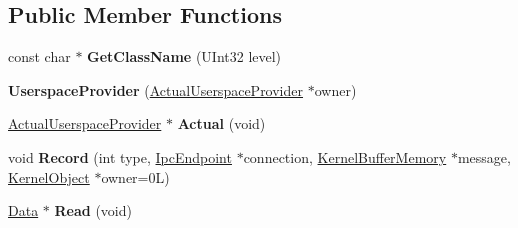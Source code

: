 \subsection*{Public Member Functions}
\begin{DoxyCompactItemize}
\item 
\mbox{\label{class_i_p_c___service_1_1_userspace_provider_aa66a9a3230febba594ed9e24ee96bea9}} 
const char $\ast$ {\bfseries Get\+Class\+Name} (U\+Int32 level)
\item 
\mbox{\label{class_i_p_c___service_1_1_userspace_provider_a3ecac81bc7330a2c17c515480062c936}} 
{\bfseries Userspace\+Provider} (\hyperlink{class_i_p_c___service_1_1_actual_userspace_provider}{Actual\+Userspace\+Provider} $\ast$owner)
\item 
\mbox{\label{class_i_p_c___service_1_1_userspace_provider_a0f2005f4b1e5db6a227bebeec9b6ac8a}} 
\hyperlink{class_i_p_c___service_1_1_actual_userspace_provider}{Actual\+Userspace\+Provider} $\ast$ {\bfseries Actual} (void)
\item 
\mbox{\label{class_i_p_c___service_1_1_userspace_provider_a47f1f911a4e544c36df6577100ece033}} 
void {\bfseries Record} (int type, \hyperlink{class_ipc_endpoint}{Ipc\+Endpoint} $\ast$connection, \hyperlink{class_kernel_buffer_memory}{Kernel\+Buffer\+Memory} $\ast$message, \hyperlink{class_kernel_object}{Kernel\+Object} $\ast$owner=0\+L)
\item 
\mbox{\label{class_i_p_c___service_1_1_userspace_provider_a26dffbb79eb695abda719dd24e4e195a}} 
\hyperlink{class_i_p_c___service_1_1_userspace_provider_1_1_data}{Data} $\ast$ {\bfseries Read} (void)
\end{DoxyCompactItemize}

